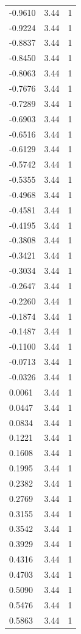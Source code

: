 \begin{longtable}{lrr}
  -0.9610 & 3.44 & 1 \\
  -0.9224 & 3.44 & 1 \\
  -0.8837 & 3.44 & 1 \\
  -0.8450 & 3.44 & 1 \\
  -0.8063 & 3.44 & 1 \\
  -0.7676 & 3.44 & 1 \\
  -0.7289 & 3.44 & 1 \\
  -0.6903 & 3.44 & 1 \\
  -0.6516 & 3.44 & 1 \\
  -0.6129 & 3.44 & 1 \\
  -0.5742 & 3.44 & 1 \\
  -0.5355 & 3.44 & 1 \\
  -0.4968 & 3.44 & 1 \\
  -0.4581 & 3.44 & 1 \\
  -0.4195 & 3.44 & 1 \\
  -0.3808 & 3.44 & 1 \\
  -0.3421 & 3.44 & 1 \\
  -0.3034 & 3.44 & 1 \\
  -0.2647 & 3.44 & 1 \\
  -0.2260 & 3.44 & 1 \\
  -0.1874 & 3.44 & 1 \\
  -0.1487 & 3.44 & 1 \\
  -0.1100 & 3.44 & 1 \\
  -0.0713 & 3.44 & 1 \\
  -0.0326 & 3.44 & 1 \\
  0.0061 & 3.44 & 1 \\
  0.0447 & 3.44 & 1 \\
  0.0834 & 3.44 & 1 \\
  0.1221 & 3.44 & 1 \\
  0.1608 & 3.44 & 1 \\
  0.1995 & 3.44 & 1 \\
  0.2382 & 3.44 & 1 \\
  0.2769 & 3.44 & 1 \\
  0.3155 & 3.44 & 1 \\
  0.3542 & 3.44 & 1 \\
  0.3929 & 3.44 & 1 \\
  0.4316 & 3.44 & 1 \\
  0.4703 & 3.44 & 1 \\
  0.5090 & 3.44 & 1 \\
  0.5476 & 3.44 & 1 \\
  0.5863 & 3.44 & 1 \\

\end{longtable}
